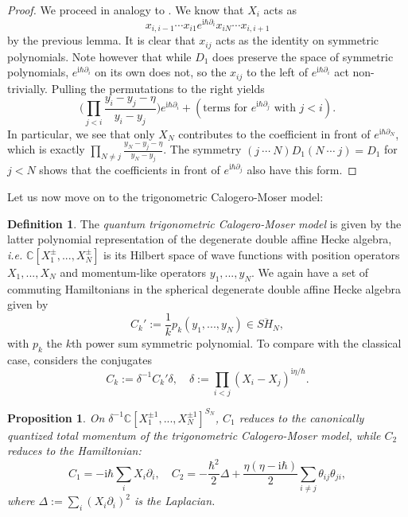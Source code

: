 \documentclass[11pt]{report}
\newtheorem{prop}[theorem]{Proposition}
\theoremstyle{definition}
\newtheorem{definition}[theorem]{Definition}
\theoremstyle{remark}
\theoremstyle{remark}
\newcommand{\C}{\mathbb{C}}
\newcommand{\I}{\mathrm{i}}
\begin{document}
\begin{proof}
We proceed in analogy to \cite{article:jimbo:1995}. We know that $X_i$ acts as
\begin{equation*}
x_{i,i-1} \cdots x_{i1} e^{\I \hbar \partial_i} x_{iN} \cdots x_{i,i+1}
\end{equation*}
by the previous lemma. It is clear that $x_{ij}$ acts as the identity on symmetric polynomials. Note however that while $D_1$ does preserve the space of symmetric polynomials, $e^{\I \hbar \partial_i}$ on its own does not, so the $x_{ij}$ to the left of $e^{\I \hbar \partial_i}$ act non-trivially. Pulling the permutations to the right yields
\begin{equation*}
\bigg( \prod_{j < i} \frac{y_i-y_j-\eta}{y_i-y_j} \bigg) e^{\I \hbar \partial_i} + (\text{terms for } e^{\I \hbar \partial_j} \text{ with } j < i).
\end{equation*}
In particular, we see that only $X_N$ contributes to the coefficient in front of $e^{\I \hbar \partial_N}$, which is exactly $\prod_{N \neq j} \frac{y_N-y_j-\eta}{y_N-y_j}$. The symmetry $(j \ \cdots \ N) D_1 (N \ \cdots \ j) = D_1$ for $j < N$ shows that the coefficients in front of $e^{\I \hbar \partial_j}$ also have this form.
\end{proof}

Let us now move on to the trigonometric Calogero-Moser model:

\begin{definition}
The \emph{quantum trigonometric Calogero-Moser model} is given by the latter polynomial representation of the degenerate double affine Hecke algebra, \emph{i.e.} $\C[X_1^\pm,...,X_N^\pm]$ is its Hilbert space of wave functions with position operators $X_1,...,X_N$ and momentum-like operators $y_1,...,y_N$. We again have a set of commuting Hamiltonians in the spherical degenerate double affine Hecke algebra given by
\begin{equation*}
C_k' := \frac{1}{k} p_k(y_1,...,y_N) \in S\ddot H_N,
\end{equation*}
with $p_k$ the $k$th power sum symmetric polynomial. To compare with the classical case, \cite{article:etingof:2009} considers the conjugates
\begin{equation*}
C_k := \delta^{-1} C_k' \delta, \quad \delta := \prod_{i < j} (X_i-X_j)^{\I \eta / \hbar}.
\end{equation*}
\end{definition}

\begin{prop}\label{prop:trigCMHamiltonian}
On $\delta^{-1} \C[X_1^{\pm 1},...,X_N^{\pm 1}]^{S_N}$, $C_1$ reduces to the canonically quantized total momentum of the trigonometric Calogero-Moser model, while $C_2$ reduces to the Hamiltonian:
\begin{equation*}
C_1 = -\I \hbar \sum_i X_i \partial_i, \quad C_2 = -\frac{\hbar^2}{2} \Delta + \frac{\eta(\eta-\I \hbar)}{2} \sum_{i \neq j} \theta_{ij} \theta_{ji},
\end{equation*}
where $\Delta := \sum_i (X_i \partial_i)^2$ is the Laplacian.
\end{prop}
\end{document}
